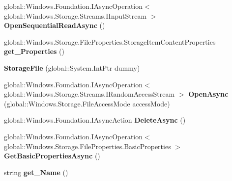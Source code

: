 \begin{DoxyCompactItemize}
\item 
\mbox{\label{class_windows_1_1_storage_1_1_storage_file_adc6fa1909202e33273e037fa3347c319}} 
global\+::\+Windows.\+Foundation.\+I\+Async\+Operation$<$ global\+::\+Windows.\+Storage.\+Streams.\+I\+Input\+Stream $>$ {\bfseries Open\+Sequential\+Read\+Async} ()
\item 
\mbox{\label{class_windows_1_1_storage_1_1_storage_file_a9a59e8a2f5bd44c25773662197b786bd}} 
global\+::\+Windows.\+Storage.\+File\+Properties.\+Storage\+Item\+Content\+Properties {\bfseries get\+\_\+\+Properties} ()
\item 
\mbox{\label{class_windows_1_1_storage_1_1_storage_file_a5c85dbe0011a81cc6ef4b8d88c05567e}} 
{\bfseries Storage\+File} (global\+::\+System.\+Int\+Ptr dummy)
\item 
\mbox{\label{class_windows_1_1_storage_1_1_storage_file_a29ee2f060ba92e79eabded8b48966776}} 
global\+::\+Windows.\+Foundation.\+I\+Async\+Operation$<$ global\+::\+Windows.\+Storage.\+Streams.\+I\+Random\+Access\+Stream $>$ {\bfseries Open\+Async} (global\+::\+Windows.\+Storage.\+File\+Access\+Mode access\+Mode)
\item 
\mbox{\label{class_windows_1_1_storage_1_1_storage_file_a6d0d928c1dc9abd71b250099c2de27f1}} 
global\+::\+Windows.\+Foundation.\+I\+Async\+Action {\bfseries Delete\+Async} ()
\item 
\mbox{\label{class_windows_1_1_storage_1_1_storage_file_acf51ed8048b0f4497f173a6c8addf43f}} 
global\+::\+Windows.\+Foundation.\+I\+Async\+Operation$<$ global\+::\+Windows.\+Storage.\+File\+Properties.\+Basic\+Properties $>$ {\bfseries Get\+Basic\+Properties\+Async} ()
\item 
\mbox{\label{class_windows_1_1_storage_1_1_storage_file_a7a2ef38514c8d6dc439918de9aa6feb7}} 
string {\bfseries get\+\_\+\+Name} ()
\item 
\mbox{\label{class_windows_1_1_storage_1_1_storage_file_ad961bebed52f4f6b04a97201c511e841}} 

\end{DoxyCompactItemize}
